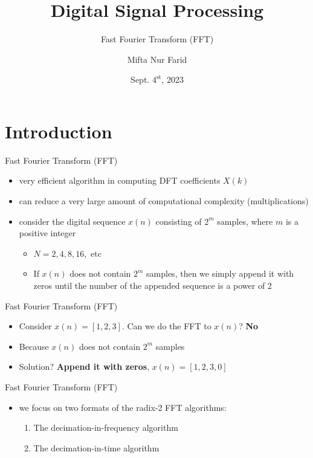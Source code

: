 \documentclass[pdflatex,compress,mathserif]{beamer}
\title{Digital Signal Processing}
\subtitle{Fast Fourier Transform (FFT)}
\author{Mifta Nur Farid}
\date{Sept. $\text{4}^\text{st}$, 2023}
\begin{document}
\maketitle

\section{Introduction}

\begin{frame}{Fast Fourier Transform (FFT)}
	\begin{itemize}
		\item very efficient algorithm in computing DFT coefficients $X(k)$
		\item can reduce a very large amount of computational complexity (multiplications)
		\item consider the digital sequence $x(n)$ consisting of $2^m$ samples, where $m$ is a positive integer
		\begin{itemize}
			\item $N = 2, 4, 8, 16, \text{ etc}$
			\item  If $x(n)$ does not contain $2^m$ samples, then we simply append it with zeros until the number of the appended sequence is a power of 2
		\end{itemize}
	\end{itemize}
\end{frame}

\begin{frame}{Fast Fourier Transform (FFT)}
	\begin{itemize}
		\item Consider $x(n) = [1, 2, 3]$. Can we do the FFT to $x(n)$? \pause \textbf{No} \pause
		\item Because $x(n)$ does not contain $2^m$ samples \pause
		\item Solution? \pause \textbf{Append it with zeros}, $x(n) = [1,2,3,0]$
	\end{itemize}
\end{frame}

\begin{frame}{Fast Fourier Transform (FFT)}
	\begin{itemize}
		\item we focus on two formats of the radix-2 FFT algorithms:
		\begin{enumerate}
			\item The decimation-in-frequency algorithm
			\item The decimation-in-time algorithm
		\end{enumerate}
	\end{itemize}
\end{frame}
\end{document}

